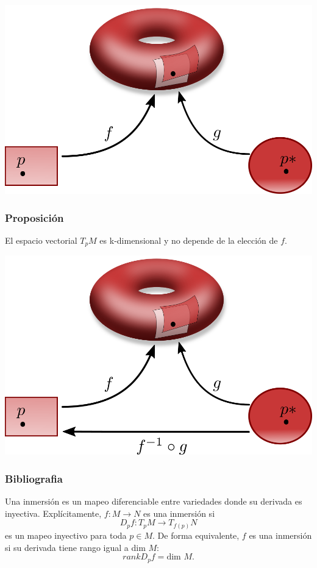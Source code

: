 \documentclass[spanish]{beamer}
\begin{document}
\begin{frame}
    \includegraphics[width=\textwidth]{../gfx/toro-4}
\end{frame}

\begin{frame}
    \frametitle{Proposici\'on}
    El espacio vectorial $T_{p}M$ es k-dimensional y no depende de la elecci\'on de $f$.
\end{frame}

\begin{frame}
    \includegraphics[width=\textwidth]{../gfx/toro-5}
\end{frame}

\begin{frame}
    \frametitle{Bibliografia}
\end{frame}

\begin{frame}
    \begin{definition}\label{def:immersion}
        Una inmersi\'on es un mapeo diferenciable entre variedades donde su
        derivada es inyectiva. Expl\'icitamente, $f:M \rightarrow N$ es una inmersi\'on si
        $$ D_{p}f: T_{p}M \rightarrow T_{f(p)}N $$
        es un mapeo inyectivo para toda $p \in M$. De forma equivalente, $f$ es una inmersi\'on
        si su derivada tiene rango igual a dim $M$:
        $$ rank D_{p}f = \text{dim }M \text{.} $$
    \end{definition}
\end{frame}
\end{document}
